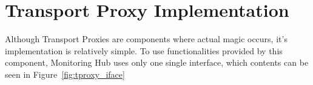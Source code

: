 \section{Transport Proxy Implementation}

Although Transport Proxies are components where actual magic occurs, it\rq{}s implementation is relatively simple. To use functionalities provided by this component, Monitoring Hub uses only one single interface, which contents can be seen in Figure~\ref{fig:tproxy_iface}